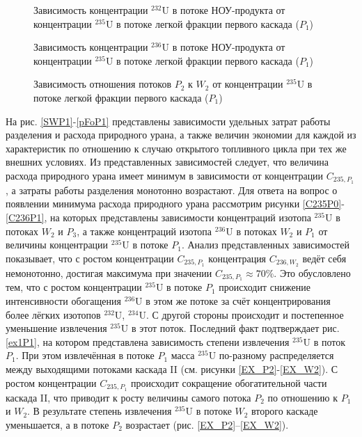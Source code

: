 \begin{figure}[ht]
  \centering
  \begin{minipage}{.5\textwidth}
    \centering
    
    \caption{{Зависимость концентрации $^{232}$U в потоке НОУ-продукта от концентрации $^{235}$U в потоке легкой фракции первого каскада ($P_1$){\label{C232P}}}}
  \end{minipage}%
  \begin{minipage}{.5\textwidth}
    \centering
    
    \caption{{Зависимость концентрации $^{236}$U в потоке НОУ-продукта от концентрации $^{235}$U в потоке легкой фракции первого каскада ($P_1$){\label{C236P}}}}
\end{minipage}
\end{figure}

\begin{figure}[ht]
    \centering
      
    \caption{Зависимость отношения потоков $P_2$ к $W_2$ от концентрации $^{235}$U в потоке легкой фракции первого каскада ($P_1$)}\label{P2W2}
\end{figure}

На рис. \ref{SWP1}-\ref{pFoP1} представлены зависимости удельных затрат работы разделения и расхода природного урана, а также величин экономии для каждой из характеристик по отношению к случаю открытого топливного цикла при тех же внешних условиях. Из представленных зависимостей следует, что величина расхода природного урана имеет минимум в зависимости от концентрации $C_{235,{P_1}}$, а затраты работы разделения монотонно возрастают. Для ответа на вопрос о появлении минимума расхода природного урана рассмотрим рисунки \ref{C235P0}-\ref{C236P1}, на которых представлены зависимости концентраций изотопа $^{235}$U в потоках $W_2$ и $P_3$, а также концентраций изотопа $^{236}$U в потоках $W_2$ и $P_1$ от величины концентрации $^{235}$U в потоке $P_1$. Анализ представленных зависимостей показывает, что с ростом концентрации $C_{235,{P_1}}$ концентрация $C_{236,{W_2}}$ ведёт себя немонотонно, достигая максимума при значении $C_{235,{P_1}} \approx 70\%$. Это обусловлено тем, что с ростом концентрации $^{235}$U в потоке $P_1$ происходит снижение интенсивности обогащения $^{236}$U в этом же потоке за счёт концентрирования более лёгких изотопов $^{232}$U, $^{234}$U. С другой стороны происходит и постепенное уменьшение извлечения $^{235}$U в этот поток. Последний факт подтверждает рис. \ref{ex1P1}, на котором представлена зависимость степени извлечения $^{235}$U в поток $P_1$. При этом извлечённая в потоке $P_1$ масса $^{235}$U по-разному распределяется между выходящими потоками каскада II (см. рисунки \ref{EX_P2}-\ref{EX_W2}).
С ростом концентрации $C_{235,{P_1}}$ происходит сокращение обогатительной части каскада II, что приводит к росту величины самого потока $P_2$ по отношению к $P_1$ и $W_2$.
В результате степень извлечения $^{235}$U в потоке $W_2$ второго каскаде уменьшается, а в потоке $P_2$ возрастает (рис. \ref{EX_P2}--\ref{EX_W2}). 

